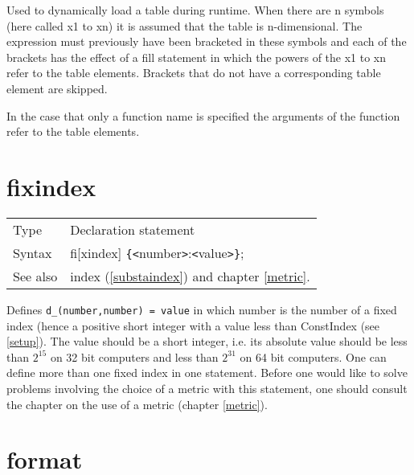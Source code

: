 \noindent Used to dynamically
load a table during runtime. When 
there are n symbols (here called x1 to xn) it is assumed that the table is 
n-dimensional. The expression must previously have been bracketed in these 
symbols and each of the brackets has the effect of a 
fill statement in which the powers of the x1 to xn refer to the 
table elements. Brackets that do not have a corresponding table element are 
skipped.

\noindent In the case that only a function name is specified the arguments 
of the function refer to the table elements.
\vspace{10mm}

 
\section{fixindex}
\label{substafixindex}

\noindent \begin{tabular}{ll}
Type & Declaration statement\\
Syntax & fi[xindex] \verb:{:{\tt<}number{\tt>}:{\tt<}value{\tt>}\verb:}:;
\\ See also & index (\ref{substaindex}) and chapter \ref{metric}.
\end{tabular} \vspace{4mm}

\noindent Defines \verb:d_(number,number) = value: in which number is the 
number of a fixed index 
(hence a positive short integer with a value less than 
ConstIndex (see \ref{setup}). The value should be a 
short integer, i.e. its absolute value should be less 
than $2^{15}$ on 32 bit computers and less than $2^{31}$ on 
64 bit 
computers. One can define more than one fixed index in one statement. 
Before one would like to solve problems involving the choice of a metric 
with this statement, one should consult the chapter on the use of a 
metric 
(chapter \ref{metric}).
\vspace{10mm}


\section{format}
\label{substaformat}

